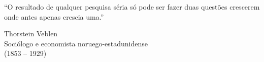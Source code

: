 
\epigraph{``O resultado de qualquer pesquisa séria só pode ser fazer
duas questões crescerem onde antes apenas crescia uma.''}{Thorstein
Veblen\\Sociólogo e economista noruego-estadunidense\\(1853 -- 1929)}
